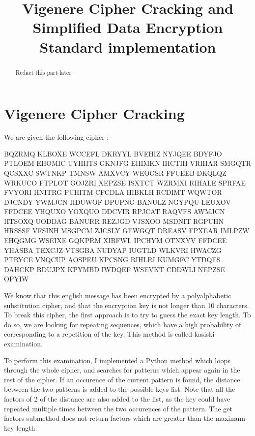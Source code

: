 \documentclass{article}
\title{\textbf{Vigenere Cipher Cracking and Simplified Data Encryption Standard implementation}}
\author{}
\date{}
\begin{document}
\maketitle \thispagestyle{fancy}

\begin{abstract}
    Redact this part later
    
\end{abstract}

\section{Vigenere Cipher Cracking}

    We are given the following cipher :

    \begin{python}
        BQZRMQ KLBOXE WCCEFL DKRYYL BVEHIZ NYJQEE BDYFJO PTLOEM EHOMIC
        UYHHTS GKNJFG EHIMKN IHCTIH VRIHAR SMGQTR QCSXXC SWTNKP TMNSW
        AMXVCY WEOGSR FFUEEB DKQLQZ WRKUCO FTPLOT GOJZRI XEPZSE ISXTCT
        WZRMXI RIHALE SPRFAE FVYORI HNITRG PUHITM CFCDLA HIBKLH RCDIMT
        WQWTOR DJCNDY YWMJCN HDUWOF DPUPNG BANULZ NGYPQU LEUXOV FFDCEE
        YHQUXO YOXQUO DDCVIR RPJCAT RAQVFS AWMJCN HTSOXQ UODDAG BANURR
        REZJGD VJSXOO MSDNIT RGPUHN HRSSSF VFSINH MSGPCM ZJCSLY GEWGQT
        DREASV FPXEAR IMLPZW EHQGMG WSEIXE GQKPRM XIBFWL IPCHYM OTNXYV
        FFDCEE YHASBA TEXCJZ VTSGBA NUDYAP IUGTLD WLKVRI HWACZG PTRYCE
        VNQCUP AOSPEU KPCSNG RIHLRI KUMGFC YTDQES DAHCKP BDUJPX KPYMBD
        IWDQEF WSEVKT CDDWLI NEPZSE OPYIW
    \end{python}

    
    We know that this english message has been encrypted by a polyalphabetic substitution cipher, and that the encryption key is not longer than 10 characters. To break this cipher, the first approach is to try to guess the exact key length. To do so, we are looking for repeating sequences, which have a high probability of corresponding to a repetition of the key. This method is called kasiski examination.\cite{vigenere}

    To perform this examination, I implemented a Python method which loops through the whole cipher, and searches for patterns which appear again in the rest of the cipher. If an occurence of the current pattern is found, the distance between the two patterns is added to the possible keys list. Note that all the factors of 2 of the distance are also added to the list, as the key could have repeated 
    multiple times between the two occurences of the pattern. The get factors submethod does not return factors
    which are greater than the maximum key length.
\end{document}
